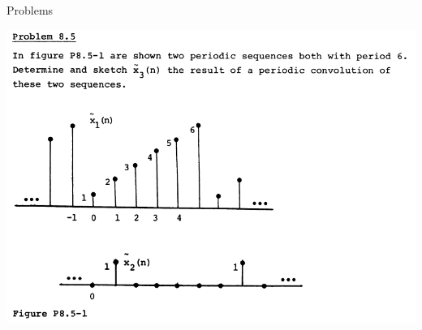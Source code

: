 \documentclass[pdflatex,compress,mathserif]{beamer}
\begin{document}
\begin{frame}{Problems}
	\begin{center}
		\includegraphics[width=0.9\linewidth]{img/img09}
	\end{center}
\end{frame}
\end{document}
